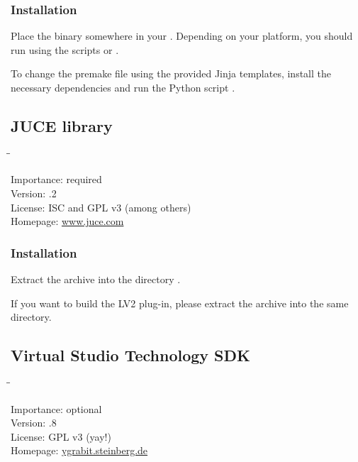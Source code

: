 \subsubsection{Installation}

Place the binary somewhere in your .  Depending on your
platform, you should run  using the scripts
 or .

To change the premake file using the provided Jinja templates, install
the necessary dependencies and run the Python script
.

\newpage %

\subsection{JUCE library}

\begin{tabbing}
  \hspace*{6em}\=\=\kill

  Importance:  \> required \\
  Version:     .2 \\
  License:     \> ISC and GPL v3 (among others) \\
  Homepage:    \> \href{http://www.juce.com/}{www.juce.com}
\end{tabbing}

\subsubsection{Installation}

Extract the archive into the directory .

If you want to build the LV2 plug-in, please extract the archive
 into the same directory.

\subsection{Virtual Studio Technology SDK}

\begin{tabbing}
  \hspace*{6em}\=\=\kill

  Importance:  \> optional \\
  Version:     .8 \\
  License:     \> GPL v3 (yay!) \\
  Homepage:    \> \href{http://ygrabit.steinberg.de/}{ygrabit.steinberg.de}
\end{tabbing}

